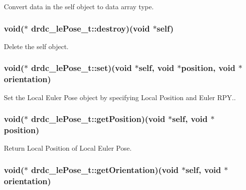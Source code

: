 Convert data in the self object to data array type. 

\hypertarget{structdrdc__lePose__t_da06ad9ab4dcca6302286ba11be53b32}{
\subsubsection[destroy]{\setlength{\rightskip}{0pt plus 5cm}void($\ast$ {\bf drdc\_\-lePose\_\-t::destroy})(void $\ast$self)}}
\label{structdrdc__lePose__t_da06ad9ab4dcca6302286ba11be53b32}


Delete the self object. 

\hypertarget{structdrdc__lePose__t_765510af2cd3050d12c281b6cac0af93}{
\subsubsection[set]{\setlength{\rightskip}{0pt plus 5cm}void($\ast$ {\bf drdc\_\-lePose\_\-t::set})(void $\ast$self, void $\ast$position, void $\ast$orientation)}}
\label{structdrdc__lePose__t_765510af2cd3050d12c281b6cac0af93}


Set the Local Euler Pose object by specifying Local Position and Euler RPY.. 

\hypertarget{structdrdc__lePose__t_975326e7d6c204a3a7f9085ba14a971a}{
\subsubsection[getPosition]{\setlength{\rightskip}{0pt plus 5cm}void($\ast$ {\bf drdc\_\-lePose\_\-t::getPosition})(void $\ast$self, void $\ast$position)}}
\label{structdrdc__lePose__t_975326e7d6c204a3a7f9085ba14a971a}


Return Local Position of Local Euler Pose. 

\hypertarget{structdrdc__lePose__t_bdb8fe5909d51047d6e1388542ff4860}{
\subsubsection[getOrientation]{\setlength{\rightskip}{0pt plus 5cm}void($\ast$ {\bf drdc\_\-lePose\_\-t::getOrientation})(void $\ast$self, void $\ast$orientation)}}
\label{structdrdc__lePose__t_bdb8fe5909d51047d6e1388542ff4860}


